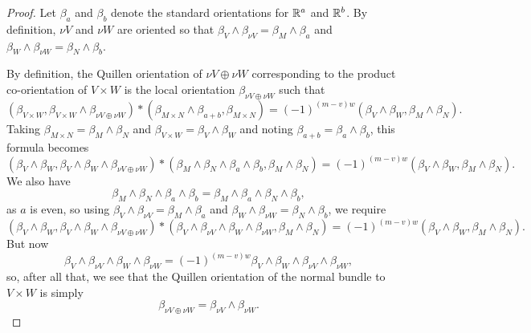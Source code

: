 \begin{proof}
	Let $\beta_a$ and $\beta_b$ denote the standard orientations for $\mathbb{R}^a$ and $\mathbb{R}^b$.
	By definition, $\nu V$ and $\nu W$ are oriented so that $\beta_V \wedge \beta_{\nu V} = \beta_M \wedge \beta_a$ and $\beta_W \wedge \beta_{\nu W} = \beta_N \wedge \beta_b$.

	By definition, the Quillen orientation of $\nu V \oplus \nu W$ corresponding to the product co-orientation of $V \times W$ is the local orientation $\beta_{\nu V \oplus \nu W}$ such that
	$$(\beta_{V \times W}, \beta_{V \times W} \wedge \beta_{\nu V \oplus \nu W})*(\beta_{M \times N} \wedge \beta_{a+b},\beta_{M \times N}) = (-1)^{(m-v)w}(\beta_V \wedge \beta_W,\beta_M \wedge \beta_N).$$
	Taking $\beta_{M \times N} = \beta_M \wedge \beta_N$ and $\beta_{V \times W} = \beta_V \wedge \beta_W$ and noting $\beta_{a+b} = \beta_a \wedge \beta_b$, this formula becomes
	$$(\beta_V \wedge \beta_W, \beta_V \wedge \beta_W \wedge \beta_{\nu V \oplus \nu W})*(\beta_M \wedge \beta_N \wedge \beta_a \wedge \beta_b,\beta_M \wedge \beta_N) = (-1)^{(m-v)w}(\beta_V \wedge \beta_W,\beta_M \wedge \beta_N).$$
	We also have $$\beta_M \wedge \beta_N \wedge \beta_a \wedge \beta_b = \beta_M \wedge \beta_a \wedge \beta_N \wedge \beta_b,$$ as $a$ is even, so using $\beta_V \wedge \beta_{\nu V} = \beta_M \wedge \beta_a$ and $\beta_W \wedge \beta_{\nu W} = \beta_N \wedge \beta_b$, we require
	$$(\beta_V \wedge \beta_W, \beta_V \wedge \beta_W \wedge \beta_{\nu V \oplus \nu W})*(\beta_V \wedge \beta_{\nu V}\wedge\beta_W \wedge \beta_{\nu W} ,\beta_M \wedge \beta_N) = (-1)^{(m-v)w}(\beta_V \wedge \beta_W,\beta_M \wedge \beta_N).$$
	But now $$\beta_V \wedge \beta_{\nu V}\wedge\beta_W \wedge \beta_{\nu W} = (-1)^{(m-v)w} \beta_V \wedge \beta_{W}\wedge\beta_{\nu V} \wedge \beta_{\nu W},$$
	so, after all that, we see that the Quillen orientation of the normal bundle to $V \times W$ is simply $$\beta_{\nu V \oplus \nu W} = \beta_{\nu V} \wedge \beta_{\nu W}.$$
\end{proof}

